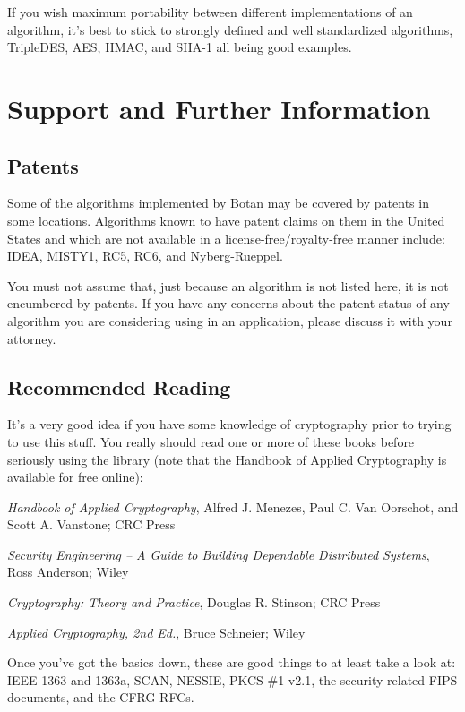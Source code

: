 \documentclass{article}
\begin{document}
If you wish maximum portability between different implementations of an
algorithm, it's best to stick to strongly defined and well standardized
algorithms, TripleDES, AES, HMAC, and SHA-1 all being good examples.

\pagebreak
\section{Support and Further Information}

\subsection{Patents}

Some of the algorithms implemented by Botan may be covered by patents in some
locations. Algorithms known to have patent claims on them in the United States
and which are not available in a license-free/royalty-free manner include:
IDEA, MISTY1, RC5, RC6, and Nyberg-Rueppel.

You must not assume that, just because an algorithm is not listed here, it is
not encumbered by patents. If you have any concerns about the patent status of
any algorithm you are considering using in an application, please discuss it
with your attorney.

\subsection{Recommended Reading}

It's a very good idea if you have some knowledge of cryptography prior
to trying to use this stuff. You really should read one or more of
these books before seriously using the library (note that the Handbook
of Applied Cryptography is available for free online):

\setlength{\parskip}{5pt}

\noindent
\textit{Handbook of Applied Cryptography}, Alfred J. Menezes,
Paul C. Van Oorschot, and Scott A. Vanstone; CRC Press

\noindent
\textit{Security Engineering -- A Guide to Building Dependable Distributed
Systems}, Ross Anderson; Wiley

\noindent
\textit{Cryptography: Theory and Practice}, Douglas R. Stinson; CRC Press

\noindent
\textit{Applied Cryptography, 2nd Ed.}, Bruce Schneier; Wiley

\noindent
Once you've got the basics down, these are good things to at least take a look
at: IEEE 1363 and 1363a, SCAN, NESSIE, PKCS \#1 v2.1, the security related FIPS
documents, and the CFRG RFCs.
\end{document}
